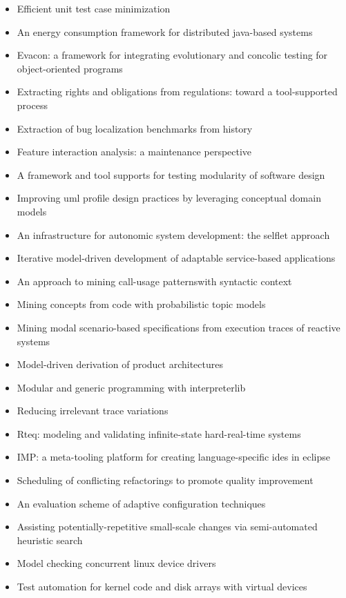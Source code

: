 {\begin{itemize}[itemsep=-1ex]
  \item Efficient unit test case minimization
  \item An energy consumption framework for distributed java-based systems
  \item Evacon: a framework for integrating evolutionary and concolic testing for object-oriented programs
  \item Extracting rights and obligations from regulations: toward a tool-supported process
  \item Extraction of bug localization benchmarks from history
  \item Feature interaction analysis: a maintenance perspective
  \item A framework and tool supports for testing modularity of software design
  \item Improving uml profile design practices by leveraging conceptual domain models
  \item An infrastructure for autonomic system development: the selflet approach
  \item Iterative model-driven development of adaptable service-based applications
  \item An approach to mining call-usage patternswith syntactic context
  \item Mining concepts from code with probabilistic topic models
  \item Mining modal scenario-based specifications from execution traces of reactive systems
  \item Model-driven derivation of product architectures
  \item Modular and generic programming with interpreterlib
  \item Reducing irrelevant trace variations
  \item Rteq: modeling and validating infinite-state hard-real-time systems
  \item IMP: a meta-tooling platform for creating language-specific ides in eclipse
  \item Scheduling of conflicting refactorings to promote quality improvement
  \item An evaluation scheme of adaptive configuration techniques
  \item Assisting potentially-repetitive small-scale changes via semi-automated heuristic search
  \item Model checking concurrent linux device drivers
  \item Test automation for kernel code and disk arrays with virtual devices

\end{itemize}}
